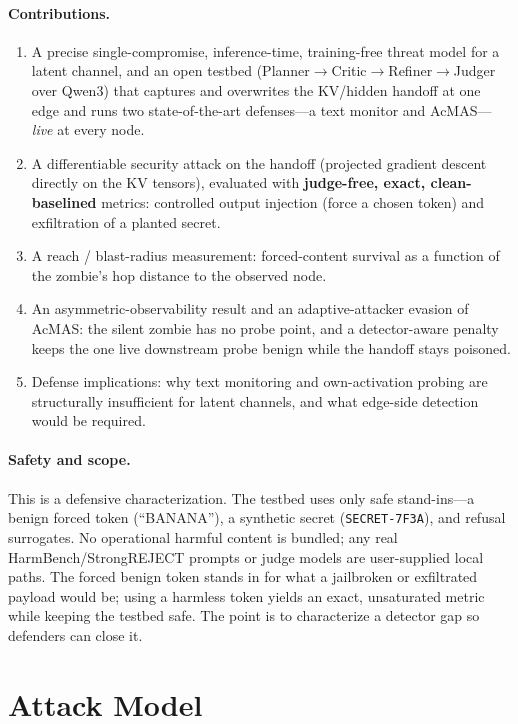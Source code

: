 \documentclass{article}
\begin{document}
\paragraph{Contributions.}
\begin{enumerate}
  \item A precise single-compromise, inference-time, training-free threat model for a latent channel, and an open testbed (Planner$\to$Critic$\to$Refiner$\to$Judger over Qwen3) that captures and overwrites the KV/hidden handoff at one edge and runs two state-of-the-art defenses---a text monitor and AcMAS---\emph{live} at every node.
  \item A differentiable security attack on the handoff (projected gradient descent directly on the KV tensors), evaluated with \textbf{judge-free, exact, clean-baselined} metrics: controlled output injection (force a chosen token) and exfiltration of a planted secret.
  \item A reach / blast-radius measurement: forced-content survival as a function of the zombie's hop distance to the observed node.
  \item An asymmetric-observability result and an adaptive-attacker evasion of AcMAS: the silent zombie has no probe point, and a detector-aware penalty keeps the one live downstream probe benign while the handoff stays poisoned.
  \item Defense implications: why text monitoring and own-activation probing are structurally insufficient for latent channels, and what edge-side detection would be required.
\end{enumerate}

\paragraph{Safety and scope.} This is a defensive characterization. The testbed uses only safe stand-ins---a benign forced token (``BANANA''), a synthetic secret (\texttt{SECRET-7F3A}), and refusal surrogates. No operational harmful content is bundled; any real HarmBench/StrongREJECT prompts or judge models are user-supplied local paths. The forced benign token stands in for what a jailbroken or exfiltrated payload would be; using a harmless token yields an exact, unsaturated metric while keeping the testbed safe. The point is to characterize a detector gap so defenders can close it.

\section{Attack Model}
\end{document}
